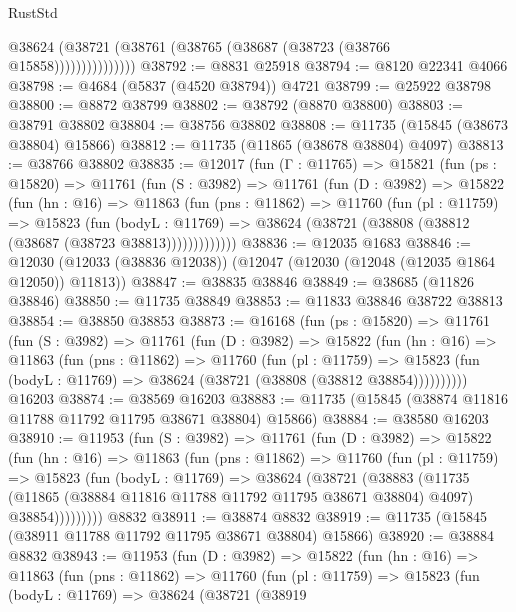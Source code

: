 \begin{lexlean}{RustStd}
\begin{coremodule}
                    @38624 (@38721 (@38761 (@38765 (@38687 (@38723 (@38766 @15858)))))))))))))))
@38792 := @8831 @25918
@38794 := @8120 @22341 @4066
@38798 := @4684 (@5837 (@4520 @38794)) @4721
@38799 := @25922 @38798
@38800 := @8872 @38799
@38802 := @38792 (@8870 @38800)
@38803 := @38791 @38802
@38804 := @38756 @38802
@38808 := @11735 (@15845 (@38673 @38804) @15866)
@38812 := @11735 (@11865 (@38678 @38804) @4097)
@38813 := @38766 @38802
@38835 := @12017
    (fun (Γ : @11765) =>
    @15821
      (fun (ps : @15820) =>
      @11761
        (fun (S : @3982) =>
        @11761
          (fun (D : @3982) =>
          @15822
            (fun (hn : @16) =>
            @11863
              (fun (pns : @11862) =>
              @11760
                (fun (pl : @11759) =>
                @15823
                  (fun (bodyL : @11769) =>
                  @38624 (@38721 (@38808 (@38812 (@38687 (@38723 @38813)))))))))))))
@38836 := @12035 @1683
@38846 := @12030 (@12033 (@38836 @12038)) (@12047 (@12030 (@12048 (@12035 @1864 @12050)) @11813))
@38847 := @38835 @38846
@38849 := @38685 (@11826 @38846)
@38850 := @11735 @38849
@38853 := @11833 @38846 @38722 @38813
@38854 := @38850 @38853
@38873 := @16168
    (fun (ps : @15820) =>
    @11761
      (fun (S : @3982) =>
      @11761
        (fun (D : @3982) =>
        @15822
          (fun (hn : @16) =>
          @11863
            (fun (pns : @11862) =>
            @11760
              (fun (pl : @11759) =>
              @15823 (fun (bodyL : @11769) => @38624 (@38721 (@38808 (@38812 @38854))))))))))
    @16203
@38874 := @38569 @16203
@38883 := @11735 (@15845 (@38874 @11816 @11788 @11792 @11795 @38671 @38804) @15866)
@38884 := @38580 @16203
@38910 := @11953
    (fun (S : @3982) =>
    @11761
      (fun (D : @3982) =>
      @15822
        (fun (hn : @16) =>
        @11863
          (fun (pns : @11862) =>
          @11760
            (fun (pl : @11759) =>
            @15823
              (fun (bodyL : @11769) =>
              @38624
                (@38721
                  (@38883
                    (@11735
                      (@11865 (@38884 @11816 @11788 @11792 @11795 @38671 @38804) @4097)
                      @38854)))))))))
    @8832
@38911 := @38874 @8832
@38919 := @11735 (@15845 (@38911 @11788 @11792 @11795 @38671 @38804) @15866)
@38920 := @38884 @8832
@38943 := @11953
    (fun (D : @3982) =>
    @15822
      (fun (hn : @16) =>
      @11863
        (fun (pns : @11862) =>
        @11760
          (fun (pl : @11759) =>
          @15823
            (fun (bodyL : @11769) =>
            @38624
              (@38721
                (@38919

\end{coremodule}
\end{lexlean}
